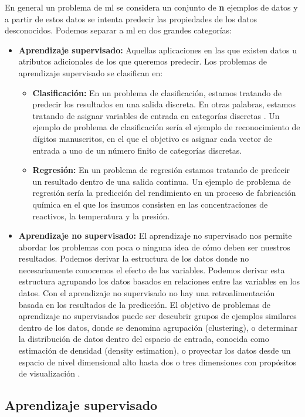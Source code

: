 En general un problema de \ac{ml} se considera un conjunto de \textbf{n} ejemplos de datos y a partir de estos datos se intenta predecir las propiedades de los datos desconocidos. 
Podemos separar a \ac{ml} en dos grandes categorías:
\begin{itemize}
	\item \textbf{Aprendizaje supervisado:} Aquellas aplicaciones en las que existen datos u atributos adicionales de los que queremos predecir. Los problemas de aprendizaje supervisado se clasifican en: 
    \begin{itemize}
    	\item  \textbf{Clasificación:} En un problema de clasificación, estamos tratando de predecir los resultados en una salida discreta. En otras palabras, estamos tratando de asignar variables de entrada en categorías discretas . Un ejemplo de problema de clasificación sería el ejemplo de reconocimiento de dígitos manuscritos, en el que el objetivo es asignar cada vector de entrada a uno de un número finito de categorías discretas.
   		\item \textbf{Regresión:} En un problema de regresión estamos tratando de predecir un resultado dentro de una salida continua. Un ejemplo de problema de regresión sería la predicción del rendimiento en un proceso de fabricación química en el que los insumos consisten en las concentraciones de reactivos, la temperatura y la presión.
    \end{itemize}
    \item \textbf{Aprendizaje no supervisado:} El aprendizaje no supervisado nos permite abordar los problemas con poca o ninguna idea de cómo deben ser nuestros resultados. Podemos derivar la estructura de los datos donde no necesariamente conocemos el efecto de las variables. Podemos derivar esta estructura agrupando los datos basados en relaciones entre las variables en los datos. Con el aprendizaje no supervisado no hay una retroalimentación basada en los resultados de la predicción.
    El objetivo de problemas de aprendizaje no supervisados puede ser descubrir grupos de ejemplos similares dentro de los datos, donde se denomina agrupación (clustering), o determinar la distribución de datos dentro del espacio de entrada, conocida como estimación de densidad (density estimation), o proyectar los datos desde un espacio de nivel dimensional alto hasta dos o tres dimensiones con propósitos de visualización \citep{bishop}.
\end{itemize}

\subsection{Aprendizaje supervisado}\label{sub:aprendizajesupervisado}

